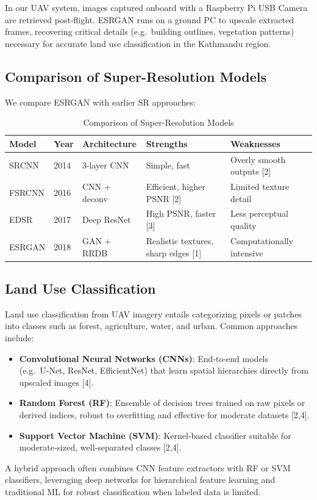 In our UAV system, images captured onboard with a Raspberry Pi USB Camera are retrieved post‑flight. ESRGAN runs on a ground PC to upscale extracted frames, recovering critical details (e.g.\ building outlines, vegetation patterns) necessary for accurate land use classification in the Kathmandu region.

\subsection{Comparison of Super-Resolution Models}
We compare ESRGAN with earlier SR approaches:

\begin{table}[H]
\centering
\renewcommand{\arraystretch}{1.2}
\setlength{\tabcolsep}{6pt}
\begin{tabular}{@{} l l p{3cm} p{3cm} p{3cm} @{}}
    \toprule
    \textbf{Model} & \textbf{Year} & \textbf{Architecture} & \textbf{Strengths} & \textbf{Weaknesses} \\
    \midrule
    SRCNN   & 2014 & 3-layer CNN & Simple, fast & Overly smooth outputs [2] \\
    FSRCNN  & 2016 & CNN + deconv & Efficient, higher PSNR [2] & Limited texture detail \\
    EDSR    & 2017 & Deep ResNet & High PSNR, faster [3] & Less perceptual quality \\
    ESRGAN  & 2018 & GAN + RRDB & Realistic textures, sharp edges [1] & Computationally intensive \\
    \bottomrule
  \end{tabular}
  \caption{Comparison of Super-Resolution Models}
\label{tab:sr_models}
\end{table}


\subsection{Land Use Classification}
Land use classification from UAV imagery entails categorizing pixels or patches into classes such as forest, agriculture, water, and urban. Common approaches include:
\begin{itemize}
  \item \textbf{Convolutional Neural Networks (CNNs)}: End‑to‑end models (e.g.\ U‑Net, ResNet, EfficientNet) that learn spatial hierarchies directly from upscaled images [4].
  \item \textbf{Random Forest (RF)}: Ensemble of decision trees trained on raw pixels or derived indices, robust to overfitting and effective for moderate datasets [2,4].
  \item \textbf{Support Vector Machine (SVM)}: Kernel‑based classifier suitable for moderate‑sized, well‑separated classes [2,4].
\end{itemize}
A hybrid approach often combines CNN feature extractors with RF or SVM classifiers, leveraging deep networks for hierarchical feature learning and traditional ML for robust classification when labeled data is limited.

